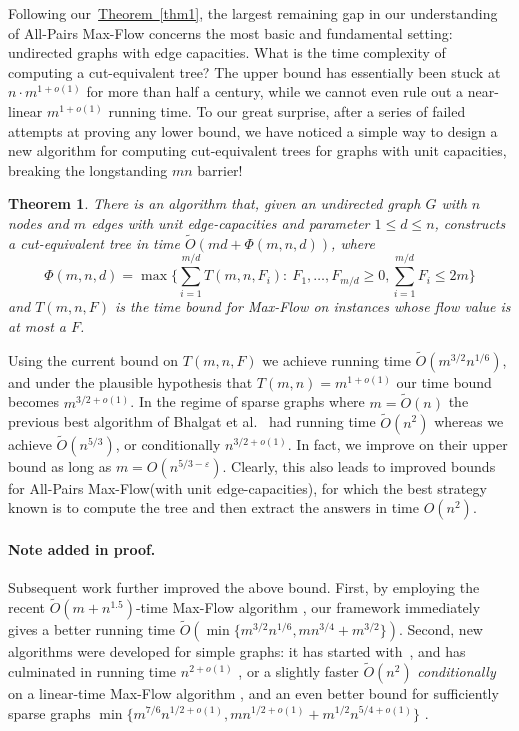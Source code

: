 \documentclass[11pt]{article}
\numberwithin{equation}{section}
\newtheorem{theorem}{Theorem}[section]
\theoremstyle{definition}
\theoremstyle{plain}
\newcommand{\expref}[2]{\hyperref[#2]{#1~\ref{#2}}}
\theoremstyle{plain}
\newcommand{\ProblemName}[1]{\textsf{#1}}
\newcommand{\MF}{\ProblemName{Max-Flow}\xspace}
\newcommand{\APMF}{\ProblemName{All-Pairs Max-Flow}\xspace}
\newcommand\eps{\varepsilon}
\newcommand\tO{\ensuremath{\widetilde O}}  %
\begin{document}
\medskip

Following our~\expref{Theorem}{thm1}, the largest remaining gap in our understanding of \APMF concerns the most basic and fundamental setting: undirected graphs with edge capacities. What is the time complexity of computing a cut-equivalent tree? The upper bound has essentially been stuck at $n \cdot m^{1+o(1)}$ for more than half a century, while we cannot even rule out a near-linear $m^{1+o(1)}$ running time.
To our great surprise, after a series of failed attempts at proving any lower bound, we have noticed a simple way to design a new algorithm for computing cut-equivalent trees for graphs with unit capacities, breaking the longstanding $mn$ barrier!

\begin{theorem}\label{Theorem:Algorithm}
  There is an algorithm that, given an undirected graph $G$ with $n$ nodes and $m$ edges
%
with unit edge-capacities
and parameter $1\le d \le n$, constructs a cut-equivalent tree in time
%
  ${\tO}( md + \Phi(m,n,d) )$,      %
  where
  \[
    \Phi(m,n,d)=\max\Big\{\sum_{i=1}^{m/d} T(m,n,F_i):\ F_1,\dots,F_{m/d}\geq 0,\sum_{i=1}^{m/d} F_i\leq 2m \Big\}
  \]
  and $T(m,n,F)$ is the time bound for \MF on instances
%
whose
flow value is at most a $F$.
\end{theorem}


Using the current bound on $T(m,n,F)$ we achieve running time
%
  ${\tO}(m^{3/2}n^{1/6})$,       %
and under the plausible hypothesis that $T(m,n)=m^{1+o(1)}$
our time bound becomes $m^{3/2 + o(1)}$.
In the regime of sparse graphs where $m=\tO(n)$ the previous best algorithm of Bhalgat et al.~\cite{BHKP07} had running time
%
  ${\tO}(n^2)$      %
whereas we achieve $\tO(n^{5/3})$, or conditionally $n^{3/2+o(1)}$.
In fact, we improve on their upper bound as long as $m=O(n^{5/3-\eps})$.
Clearly, this also leads to improved bounds for \APMF (with unit edge-capacities), for which the best strategy known is to compute the tree
and then extract the answers in time $O(n^2)$.

\paragraph{Note added in proof.}
Subsequent work further improved the above bound.
First, by employing the recent $\widetilde{O}(m+n^{1.5})$-time \MF algorithm \cite{linearflow21},
our framework immediately gives a better running time $\widetilde{O}(\min\{m^{3/2}n^{1/6},mn^{3/4}+m^{3/2}\})$.
Second, new algorithms were developed for simple graphs:
it has started with~\cite{AKT21_stoc},
and has culminated in running time $n^{2+o(1)}$ \cite{AKT21_arxiv,LPS21},
or a slightly faster $\widetilde{O}(n^2)$ \emph{conditionally} on a linear-time \MF algorithm \cite{Zhang21},
and an even better bound for sufficiently sparse graphs
$\min \{ m^{7/6}n^{1/2+o(1)} , m n^{1/2+o(1)}+m^{1/2}n^{5/4+o(1)} \}$ \cite{LPS21}.
\end{document}
